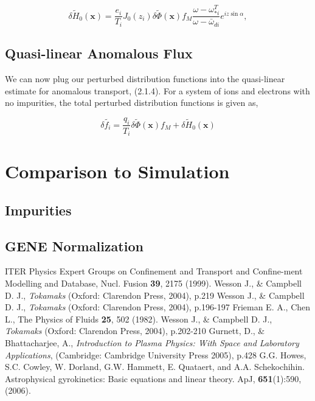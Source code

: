\documentclass[12pt]{article}
\numberwithin{equation}{subsection}
\begin{document}
   \begin{equation}
      \delta\widetilde{H}_0(\bm{x}) = \frac{e_i}{T_i}J_0(z_i)\delta\widetilde{\Phi}(\bm{x})
                                      f_M\frac{\omega-\omega_{*i}^T}{\omega-\bar{\omega}_{di}}e^{iz\sin\alpha},
   \end{equation}

\subsection{Quasi-linear Anomalous Flux}
   \quad We can now plug our perturbed distribution functions into the quasi-linear estimate for anomalous transport, (2.1.4). For a
system of ions and electrons with no impurities, the total perturbed distribution functions is given as,
   
   \begin{equation}
      \delta \widetilde{f_i} = \frac{q_i}{T_i}\delta\widetilde{\Phi}(\bm{x})f_M + \delta\widetilde{H}_0(\bm{x})
   \end{equation}


\section{Comparison to Simulation}

\subsection{Impurities}

\subsection{GENE Normalization}


\begin{thebibliography}{0}
   
    ITER Physics Expert Groups on Confinement and Transport and Confine-ment Modelling and Database, Nucl. Fusion \textbf{39}, 2175 (1999).
    Wesson J., \& Campbell D. J., \textit{Tokamaks} (Oxford: Clarendon Press, 2004), p.219
    Wesson J., \& Campbell D. J., \textit{Tokamaks} (Oxford: Clarendon Press, 2004), p.196-197
    Frieman E. A., Chen L., The Physics of Fluids \textbf{25}, 502 (1982).
    Wesson J., \& Campbell D. J., \textit{Tokamaks} (Oxford: Clarendon Press, 2004), p.202-210
    Gurnett, D., \& Bhattacharjee, A., \textit{Introduction to Plasma Physics: With Space and Laboratory Applications},
                       (Cambridge: Cambridge University Press 2005), p.428
    G.G. Howes, S.C. Cowley, W. Dorland, G.W. Hammett, E. Quataert, and A.A. Schekochihin.
                         Astrophysical gyrokinetics: Basic equations and linear theory. ApJ, \textbf{651}(1):590, (2006).

\end{thebibliography}
    
\end{document}
